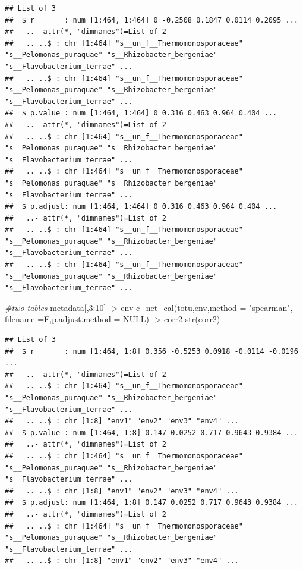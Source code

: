 \documentclass[
]{book}
\newenvironment{Shaded}{\begin{snugshade}}{\end{snugshade}}
\newcommand{\AttributeTok}[1]{\textcolor[rgb]{0.77,0.63,0.00}{#1}}
\newcommand{\CommentTok}[1]{\textcolor[rgb]{0.56,0.35,0.01}{\textit{#1}}}
\newcommand{\ConstantTok}[1]{\textcolor[rgb]{0.00,0.00,0.00}{#1}}
\newcommand{\DecValTok}[1]{\textcolor[rgb]{0.00,0.00,0.81}{#1}}
\newcommand{\FunctionTok}[1]{\textcolor[rgb]{0.00,0.00,0.00}{#1}}
\newcommand{\NormalTok}[1]{#1}
\newcommand{\OtherTok}[1]{\textcolor[rgb]{0.56,0.35,0.01}{#1}}
\newcommand{\SpecialCharTok}[1]{\textcolor[rgb]{0.00,0.00,0.00}{#1}}
\newcommand{\StringTok}[1]{\textcolor[rgb]{0.31,0.60,0.02}{#1}}
\begin{document}
\begin{verbatim}
## List of 3
##  $ r       : num [1:464, 1:464] 0 -0.2508 0.1847 0.0114 0.2095 ...
##   ..- attr(*, "dimnames")=List of 2
##   .. ..$ : chr [1:464] "s__un_f__Thermomonosporaceae" "s__Pelomonas_puraquae" "s__Rhizobacter_bergeniae" "s__Flavobacterium_terrae" ...
##   .. ..$ : chr [1:464] "s__un_f__Thermomonosporaceae" "s__Pelomonas_puraquae" "s__Rhizobacter_bergeniae" "s__Flavobacterium_terrae" ...
##  $ p.value : num [1:464, 1:464] 0 0.316 0.463 0.964 0.404 ...
##   ..- attr(*, "dimnames")=List of 2
##   .. ..$ : chr [1:464] "s__un_f__Thermomonosporaceae" "s__Pelomonas_puraquae" "s__Rhizobacter_bergeniae" "s__Flavobacterium_terrae" ...
##   .. ..$ : chr [1:464] "s__un_f__Thermomonosporaceae" "s__Pelomonas_puraquae" "s__Rhizobacter_bergeniae" "s__Flavobacterium_terrae" ...
##  $ p.adjust: num [1:464, 1:464] 0 0.316 0.463 0.964 0.404 ...
##   ..- attr(*, "dimnames")=List of 2
##   .. ..$ : chr [1:464] "s__un_f__Thermomonosporaceae" "s__Pelomonas_puraquae" "s__Rhizobacter_bergeniae" "s__Flavobacterium_terrae" ...
##   .. ..$ : chr [1:464] "s__un_f__Thermomonosporaceae" "s__Pelomonas_puraquae" "s__Rhizobacter_bergeniae" "s__Flavobacterium_terrae" ...
\end{verbatim}

\begin{Shaded}
\begin{Highlighting}[]
\CommentTok{\#two tables}
\NormalTok{metadata[,}\DecValTok{3}\SpecialCharTok{:}\DecValTok{10}\NormalTok{] }\OtherTok{{-}\textgreater{}}\NormalTok{ env}
\FunctionTok{c\_net\_cal}\NormalTok{(totu,env,}\AttributeTok{method =} \StringTok{"spearman"}\NormalTok{, }\AttributeTok{filename =}\NormalTok{F,}\AttributeTok{p.adjust.method =} \ConstantTok{NULL}\NormalTok{) }\OtherTok{{-}\textgreater{}}\NormalTok{ corr2}
\FunctionTok{str}\NormalTok{(corr2)}
\end{Highlighting}
\end{Shaded}

\begin{verbatim}
## List of 3
##  $ r       : num [1:464, 1:8] 0.356 -0.5253 0.0918 -0.0114 -0.0196 ...
##   ..- attr(*, "dimnames")=List of 2
##   .. ..$ : chr [1:464] "s__un_f__Thermomonosporaceae" "s__Pelomonas_puraquae" "s__Rhizobacter_bergeniae" "s__Flavobacterium_terrae" ...
##   .. ..$ : chr [1:8] "env1" "env2" "env3" "env4" ...
##  $ p.value : num [1:464, 1:8] 0.147 0.0252 0.717 0.9643 0.9384 ...
##   ..- attr(*, "dimnames")=List of 2
##   .. ..$ : chr [1:464] "s__un_f__Thermomonosporaceae" "s__Pelomonas_puraquae" "s__Rhizobacter_bergeniae" "s__Flavobacterium_terrae" ...
##   .. ..$ : chr [1:8] "env1" "env2" "env3" "env4" ...
##  $ p.adjust: num [1:464, 1:8] 0.147 0.0252 0.717 0.9643 0.9384 ...
##   ..- attr(*, "dimnames")=List of 2
##   .. ..$ : chr [1:464] "s__un_f__Thermomonosporaceae" "s__Pelomonas_puraquae" "s__Rhizobacter_bergeniae" "s__Flavobacterium_terrae" ...
##   .. ..$ : chr [1:8] "env1" "env2" "env3" "env4" ...
\end{verbatim}
\end{document}
